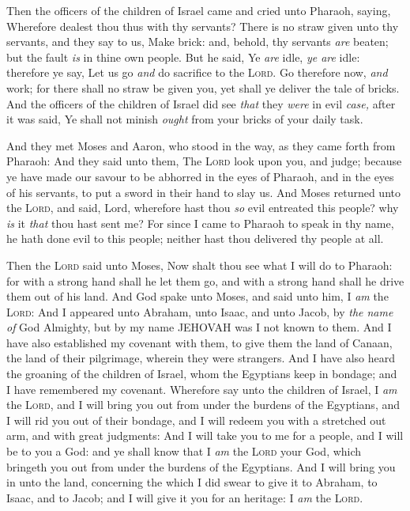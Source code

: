 \documentclass[11pt,letterpaper,oneside]{memoir}
\begin{document}
Then the officers of the children of Israel came and cried unto Pharaoh,
saying, Wherefore dealest thou thus with thy servants? There is no straw
given unto thy servants, and they say to us, Make brick: and, behold,
thy servants \emph{are} beaten; but the fault \emph{is} in thine own
people. But he said, Ye \emph{are} idle, \emph{ye are} idle: therefore
ye say, Let us go \emph{and} do sacrifice to the \textsc{Lord}. Go
therefore now, \emph{and} work; for there shall no straw be given you,
yet shall ye deliver the tale of bricks. And the officers of the
children of Israel did see \emph{that} they \emph{were} in evil
\emph{case,} after it was said, Ye shall not minish \emph{ought} from
your bricks of your daily task.

And they met Moses and Aaron, who stood in the way, as they came forth
from Pharaoh: And they said unto them, The \textsc{Lord} look upon you,
and judge; because ye have made our savour to be abhorred in the eyes of
Pharaoh, and in the eyes of his servants, to put a sword in their hand
to slay us. And Moses returned unto the \textsc{Lord}, and said, Lord,
wherefore hast thou \emph{so} evil entreated this people? why \emph{is}
it \emph{that} thou hast sent me? For since I came to Pharaoh to speak
in thy name, he hath done evil to this people; neither hast thou
delivered thy people at all.

Then the \textsc{Lord} said unto Moses, Now shalt thou see what I will
do to Pharaoh: for with a strong hand shall he let them go, and with a
strong hand shall he drive them out of his land. And God spake unto
Moses, and said unto him, I \emph{am} the \textsc{Lord}: And I appeared
unto Abraham, unto Isaac, and unto Jacob, by \emph{the name of} God
Almighty, but by my name JEHOVAH was I not known to them. And I have
also established my covenant with them, to give them the land of Canaan,
the land of their pilgrimage, wherein they were strangers. And I have
also heard the groaning of the children of Israel, whom the Egyptians
keep in bondage; and I have remembered my covenant. Wherefore say unto
the children of Israel, I \emph{am} the \textsc{Lord}, and I will bring
you out from under the burdens of the Egyptians, and I will rid you out
of their bondage, and I will redeem you with a stretched out arm, and
with great judgments: And I will take you to me for a people, and I will
be to you a God: and ye shall know that I \emph{am} the \textsc{Lord}
your God, which bringeth you out from under the burdens of the
Egyptians. And I will bring you in unto the land, concerning the which I
did swear to give it to Abraham, to Isaac, and to Jacob; and I will give
it you for an heritage: I \emph{am} the \textsc{Lord}.
\end{document}
